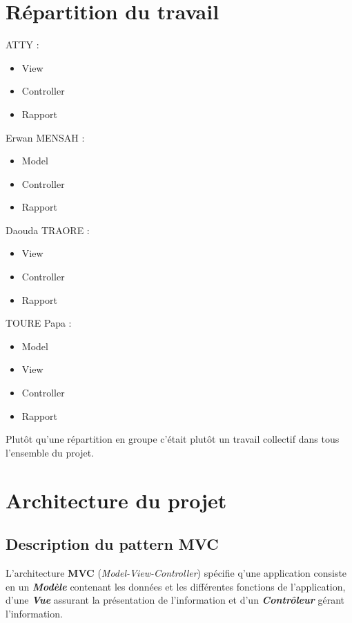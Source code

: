 \documentclass[12pt]{article}
\begin{document}
\section{Répartition du travail}

ATTY : 
\begin{itemize}
	\item View
	\item Controller
	\item Rapport
\end{itemize}
Erwan MENSAH :
\begin{itemize}
	\item Model
	\item Controller
	\item Rapport
\end{itemize}
Daouda TRAORE :
\begin{itemize}
	\item View
	\item Controller
	\item Rapport
\end{itemize}
TOURE Papa :
\begin{itemize}
	\item Model
	\item View
	\item Controller
	\item Rapport
\end{itemize}
Plutôt qu'une répartition en groupe c'était plutôt un travail collectif dans tous l'ensemble du projet.

\section{Architecture du projet}
\subsection{Description du pattern MVC}
L'architecture \textbf{MVC} (\textit{Model-View-Controller}) spécifie q'une application consiste en un
\textbf{\textit{Modèle}} contenant les données et les différentes fonctions de l'application, d'une
\textbf{\textit{Vue}} assurant la présentation de l'information et d'un \textbf{\textit{Contrôleur}}
gérant l'information.
\end{document}
